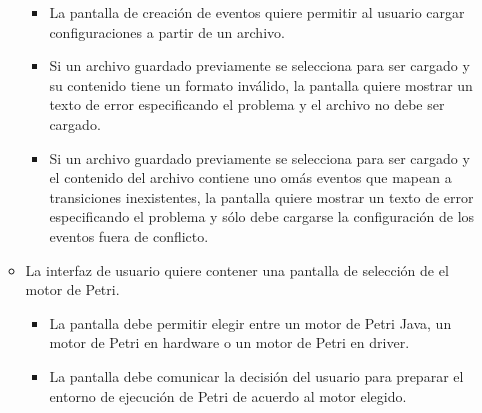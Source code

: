 \begin{enumerate}
\begin{itemize}
\begin{itemize}
	    	    \item La pantalla de creación de eventos quiere permitir al usuario
	    	    cargar configuraciones a partir de un archivo.
	    	    \item Si un archivo guardado previamente se selecciona para ser
	    	    cargado y su contenido tiene un formato inválido, la pantalla
	    	    quiere mostrar un texto de error especificando el problema y el
	    	    archivo no debe ser cargado.
	    	    \item Si un archivo guardado previamente se selecciona para ser
	    	    cargado y el contenido del archivo contiene uno omás eventos que
	    	    mapean a transiciones inexistentes, la pantalla quiere mostrar un
	    	    texto de error especificando el problema y sólo debe cargarse la
	    	    configuración de los eventos fuera de conflicto.
	    \end{itemize}
	     \item La interfaz de usuario quiere contener una pantalla de selección de
	     el motor de Petri.
	     \begin{itemize}
	         \item La pantalla debe permitir elegir entre un motor de Petri Java,
	         un motor de Petri en hardware o un motor de Petri en driver.
	         \item La pantalla debe comunicar la decisión del usuario para preparar
	         el entorno de ejecución de Petri de acuerdo al motor elegido.
	     \end{itemize}
	         
	\end{itemize}
\end{enumerate}